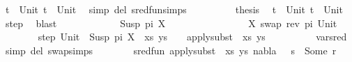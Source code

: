 \begin{isabellebody}
\ {\isacartoucheopen}t{}\ {\isacharequal}{\kern0pt}\ Unit{\isacartoucheclose}\ {\isacartoucheopen}t{}\ {\isacharequal}{\kern0pt}\ Unit{\isacartoucheclose}\ \isamarkupfalse%
\ {\isacharparenleft}{\kern0pt}simp\ del{\isacharcolon}{\kern0pt}\ sred{\isacharunderscore}{\kern0pt}fun{\isachardot}{\kern0pt}simps{\isacharparenright}{\kern0pt}\isanewline
\ \ \ \ \ \ \isamarkupfalse%
\ \isamarkupfalse%
\ {\isacharquery}{\kern0pt}thesis\ \isamarkupfalse%
\ {\isacartoucheopen}t{}\ {\isacharequal}{\kern0pt}\ Unit{\isacartoucheclose}\ {\isacartoucheopen}t{}\ {\isacharequal}{\kern0pt}\ Unit{\isacartoucheclose}\ \isamarkupfalse%
\ step\ \isamarkupfalse%
\ blast\isanewline
\ \ \ \ \isamarkupfalse%
\isanewline
\ \ \ \ \ \ \isamarkupfalse%
\ {\isacharparenleft}{\kern0pt}Susp\ pi\ X{\isacharparenright}{\kern0pt}\isanewline
\ \ \ \ \ \ %
\isanewline
\ \ \ \ \ \ \isamarkupfalse%
\ {\isacharquery}{\kern0pt}{\isasymsigma}\ {\isacharequal}{\kern0pt}\ {\isachardoublequoteopen}{\isacharbrackleft}{\kern0pt}{\isacharparenleft}{\kern0pt}X{\isacharcomma}{\kern0pt}\ swap\ {\isacharparenleft}{\kern0pt}rev\ pi{\isacharparenright}{\kern0pt}\ Unit{\isacharparenright}{\kern0pt}{\isacharbrackright}{\kern0pt}{\isachardoublequoteclose}\isanewline
\ \ \ \ \ \ \isamarkupfalse%
\ step{\isacharcolon}{\kern0pt}\ {\isachardoublequoteopen}{\isacharparenleft}{\kern0pt}{\isacharparenleft}{\kern0pt}Unit\ {\isasymapprox}{\isacharquery}{\kern0pt}\ Susp\ pi\ X{\isacharparenright}{\kern0pt}\ {\isacharhash}{\kern0pt}\ xs{\isacharcomma}{\kern0pt}\ ys{\isacharparenright}{\kern0pt}\ {\isasymturnstile}\ {\isacharquery}{\kern0pt}{\isasymsigma}\ {\isasymleadsto}\ apply{\isacharunderscore}{\kern0pt}subst\ {\isacharquery}{\kern0pt}{\isasymsigma}\ {\isacharparenleft}{\kern0pt}xs{\isacharcomma}{\kern0pt}\ ys{\isacharparenright}{\kern0pt}{\isachardoublequoteclose}\isanewline
\ \ \ \ \ \ \ \ \isamarkupfalse%
\ var{\isacharunderscore}{\kern0pt}{}{\isacharunderscore}{\kern0pt}sred\ \isamarkupfalse%
\ {\isacharparenleft}{\kern0pt}simp\ del{\isacharcolon}{\kern0pt}\ swap{\isachardot}{\kern0pt}simps{\isacharparenright}{\kern0pt}\isanewline
\ \ \ \ \ \ \isamarkupfalse%
\ {\isachardoublequoteopen}sred{\isacharunderscore}{\kern0pt}fun\ {\isacharparenleft}{\kern0pt}apply{\isacharunderscore}{\kern0pt}subst\ {\isacharquery}{\kern0pt}{\isasymsigma}\ {\isacharparenleft}{\kern0pt}xs{\isacharcomma}{\kern0pt}\ ys{\isacharparenright}{\kern0pt}{\isacharcomma}{\kern0pt}\ nabla{\isacharcomma}{\kern0pt}\ {\isacharquery}{\kern0pt}{\isasymsigma}\ {\isasymbullet}\ s{\isacharparenright}{\kern0pt}\ {\isacharequal}{\kern0pt}\ Some\ r{\isachardoublequoteclose}\isanewline

\end{isabellebody}
